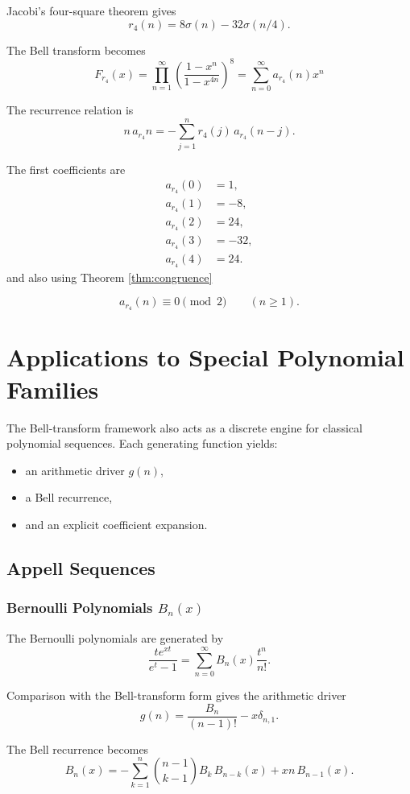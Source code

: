\documentclass[11pt, a4paper]{article}
\theoremstyle{remark}
\begin{document}
Jacobi's four-square theorem gives
\[
r_4(n)=8\sigma(n)-32\sigma(n/4).
\]

The Bell transform becomes
\[
F_{r_4}(x)
=\prod_{n=1}^{\infty}\left(\frac{1-x^n}{1-x^{4n}}\right)^8=\sum_{n=0}^{\infty}a_{r_4}(n)x^n
\]

The recurrence relation is
\[
\boxed{
n\,a_{r_4}n
=
-\sum_{j=1}^n
r_4(j)\,a_{r_4}(n-j).
}
\]

The first coefficients are
\[
\begin{aligned}
a_{r_4}(0)&=1,\\
a_{r_4}(1)&=-8,\\
a_{r_4}(2)&=24,\\
a_{r_4}(3)&=-32,\\
a_{r_4}(4)&=24.
\end{aligned}
\]
and also using Theorem \ref{thm:congruence}

\[
\boxed{
a_{r_4}(n)\equiv0\pmod2
\qquad(n\ge1).
}
\]
\section{Applications to Special Polynomial Families}

The Bell-transform framework also acts as a discrete engine for classical polynomial sequences. 
Each generating function yields:
\begin{itemize}
    \item an arithmetic driver \(g(n)\),
    \item a Bell recurrence,
    \item and an explicit coefficient expansion.
\end{itemize}

\subsection{Appell Sequences}

\subsubsection{Bernoulli Polynomials \(B_n(x)\)}

The Bernoulli polynomials are generated by
\[
\frac{te^{xt}}{e^t-1}
=
\sum_{n=0}^{\infty}
B_n(x)\frac{t^n}{n!}.
\]

Comparison with the Bell-transform form gives the arithmetic driver
\[
g(n)
=
\frac{B_n}{(n-1)!}
-
x\delta_{n,1}.
\]

The Bell recurrence becomes
\[
\boxed{
B_n(x)
=
-\sum_{k=1}^n
\binom{n-1}{k-1}
B_k\,B_{n-k}(x)
+
xn\,B_{n-1}(x).
}
\]
\end{document}

